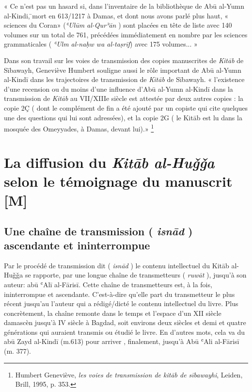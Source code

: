 \documentclass[a4paper,12pt]{report}
\begin{document}
« Ce n'est pas un hasard si, dans l'inventaire de la bibliothèque de Abū al-Yumn al-Kindi, ̄mort en 613/1217 à Damas, et dont  nous avons parlé plus haut, « sciences du Coran»    (\textit{ʿUlūm al-Qurʾān} ) sont placées en tête de liste avec 140 volumes sur un total de 761, précédées immédiatement en nombre par les sciences  grammaticales (\textit{ ʿUlm al-naḥw wa al-taṣrīf}) avec 175 volumes...  »

Dans son travail sur les voies de transmission des copies manuscrites de \textit{Kitāb} de S\=ibawayh, Geneviève Humbert souligne aussi le rôle important de Abū al-Yumn al-Kindī  dans les trajectoires de transmission de \textit{Kitāb}  de S\=ibawayh. 
« l'existence d'une recension ou du moins d'une influence d'Abū al-Yumn al-Kindī dans la transmission de \textit{Kit\=ab} au VII/XIIIe siècle est attestée par deux autres copies : la copie 2Ç ( dont le complément de fin a été ajouté par un copiste qui cite quelques une des questions  qui lui sont adressées), et la copie 2G ( le Kit\=ab est lu dans la mosquée des Omeyyades, à Damas, devant lui).» \footnote{Humbert Geneviève, \textit{les voies de transmission de kitāb de sībawayhi}, Leiden, Brill, 1995, p. 353.}

\section{La  diffusion du \textit{Kitāb  al-Huǧǧa} selon le  témoignage du manuscrit [M] }
\subsection{Une chaîne  de transmission ( \textit{isnād} )  ascendante et ininterrompue}



Par le procédé de transmission dit ( \textit{isnād} ) le contenu intellectuel du   Kitāb al-Huǧǧa se rapporte, par une longue chaîne de transmetteurs ( \textit{ruwāt} ), jusqu’à son auteur: abū ʿAlī al-Fārisī. Cette chaîne de transmetteurs est, à la fois, ininterrompue et ascendante. C’est-à-dire qu’elle part du transmetteur le plus récent  jusqu’au  l'auteur  qui a rédigé/dicté le contenu intellectuel du livre. Plus concrètement, la chaîne  remonte  dans le temps et l’espace d’un XII siècle damascèn  jusqu’à IV siècle à Bagdad, soit environs deux siècles et demi  et quatre générations  qui auraient transmis ou étudié le livre. En d’autres mots, cela va du   abū Zayd al-Kindī  (m.613)  pour arriver , finalement, jusqu’à  Abū ʿAli al-Fārisī (m. 377).  
\end{document}
